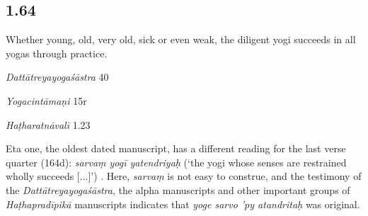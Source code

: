 \begin{ekdosis}
\subsection*{1.64}
\begin{translation}[hp01_064]
Whether young, old, very old, sick or even weak, the diligent yogi succeeds in all yogas through practice.
\end{translation}

\begin{sources}[hp01_064]
\emph{Dattātreyayogaśāstra} 40

\begin{versinnote}
\end{versinnote}

\end{sources}

\begin{testimonia}[hp01_064]
\emph{Yogacintāmaṇi} 15r

\begin{versinnote}
\end{versinnote}

\emph{Haṭharatnāvalī} 1.23

\begin{versinnote}
\end{versinnote}

\end{testimonia}

\begin{philcomm}[hp01_064]
Eta one, the oldest dated manuscript, has a different reading for the last verse quarter (164d): \emph{sarvaṃ yogī yatendriyaḥ} (`the yogi whose senses are restrained wholly succeeds [...]')  . Here, \emph{sarvaṃ} is not easy to construe, and the testimony of the \emph{Dattātreyayogaśāstra}, the alpha manuscripts and other important groups of \emph{Haṭhapradīpikā} manuscripts indicates that \emph{yoge sarvo ’py atandritaḥ} was original.
\end{philcomm}


\end{ekdosis}
